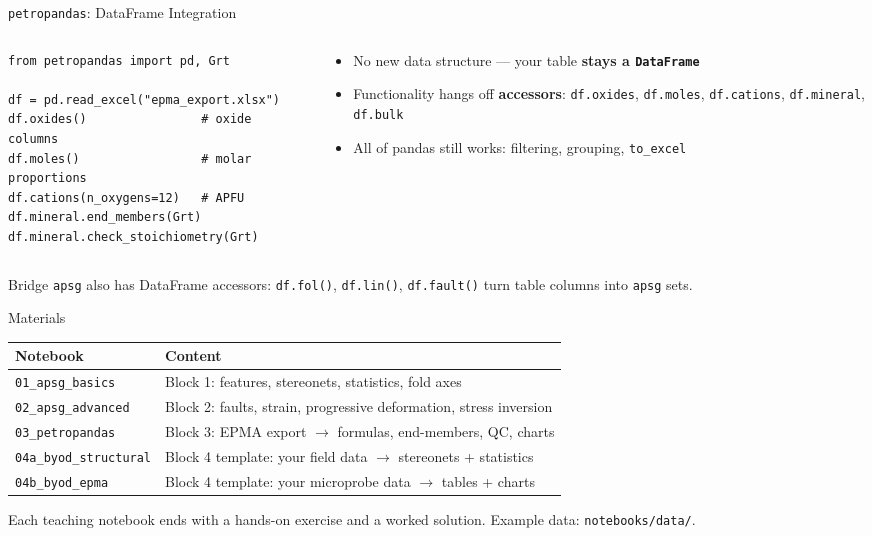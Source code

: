 \documentclass[aspectratio=169,11pt]{beamer}
\begin{document}
\begin{frame}[fragile]{\texttt{petropandas}: DataFrame Integration}
  \begin{columns}[T]
    \begin{column}{0.55\textwidth}
      \begin{lstlisting}[style=python]
from petropandas import pd, Grt

df = pd.read_excel("epma_export.xlsx")
df.oxides()                # oxide columns
df.moles()                 # molar proportions
df.cations(n_oxygens=12)   # APFU
df.mineral.end_members(Grt)
df.mineral.check_stoichiometry(Grt)
      \end{lstlisting}
    \end{column}
    \begin{column}{0.42\textwidth}
      \small
      \begin{itemize}
        \item No new data structure --- your table \textbf{stays a
              \texttt{DataFrame}}
        \item Functionality hangs off \textbf{accessors}:
              \texttt{df.oxides}, \texttt{df.moles}, \texttt{df.cations},
              \texttt{df.mineral}, \texttt{df.bulk}
        \item All of pandas still works: filtering, grouping, \texttt{to\_excel}
      \end{itemize}
    \end{column}
  \end{columns}
  \vspace{0.3cm}
  \begin{block}{Bridge}
    \texttt{apsg} also has DataFrame accessors: \texttt{df.fol()}, \texttt{df.lin()},
    \texttt{df.fault()} turn table columns into \texttt{apsg} sets.
  \end{block}
\end{frame}

\begin{frame}{Materials}
  \centering
  \small
  \begin{tabularx}{0.92\textwidth}{lX}
    \toprule
    \textbf{Notebook} & \textbf{Content} \\
    \midrule
    \texttt{01\_apsg\_basics} & Block 1: features, stereonets, statistics, fold axes \\
    \texttt{02\_apsg\_advanced} & Block 2: faults, strain, progressive deformation, stress inversion \\
    \texttt{03\_petropandas} & Block 3: EPMA export $\rightarrow$ formulas, end-members, QC, charts \\
    \texttt{04a\_byod\_structural} & Block 4 template: your field data $\rightarrow$ stereonets + statistics \\
    \texttt{04b\_byod\_epma} & Block 4 template: your microprobe data $\rightarrow$ tables + charts \\
    \bottomrule
  \end{tabularx}

  \vspace{0.4cm}
  \raggedright
  Each teaching notebook ends with a hands-on exercise and a worked solution.
  Example data: \texttt{notebooks/data/}.
\end{frame}
\end{document}
